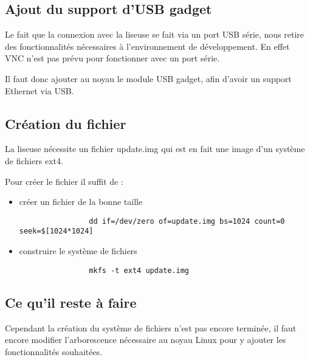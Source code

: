  \subsection{Ajout du support d'USB gadget}
 
 Le fait que la connexion avec la liseuse se fait via un port USB série, nous retire des fonctionnalités nécessaires à l'environnement de développement. En effet VNC n'est pas prévu pour fonctionner avec un port série.
 
 Il faut donc ajouter au noyau le module USB gadget, afin d'avoir un support Ethernet via USB.

\subsection{Création du fichier}

La liseuse nécessite un fichier update.img qui est en fait une image d'un système de fichiers ext4.

Pour créer le fichier il suffit de : 
	\begin{itemize}
		\item créer un fichier de la bonne taille \\
			\begin{verbatim}
				dd if=/dev/zero of=update.img bs=1024 count=0 seek=$[1024*1024]
			\end{verbatim}
		\item construire le système de fichiers \\
			\begin{verbatim}
				mkfs -t ext4 update.img
			\end{verbatim}
	\end{itemize}

\subsection{Ce qu'il reste à faire}

Cependant la création du système de fichiers n'est pas encore terminée, il faut encore modifier l'arborescence nécessaire au noyau Linux pour y ajouter les fonctionnalités souhaitées.
